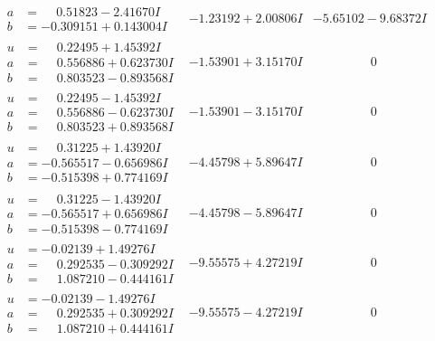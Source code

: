 \documentclass[1p]{elsarticle_modified}
\theoremstyle{definition}
\begin{document}
$$\begin{array}{c|c|c}
\begin{aligned}
a &= \phantom{-}0.51823 - 2.41670 I \\
b &= -0.309151 + 0.143004 I\end{aligned}
 & -1.23192 + 2.00806 I & -5.65102 - 9.68372 I \\ \hline\begin{aligned}
u &= \phantom{-}0.22495 + 1.45392 I \\
a &= \phantom{-}0.556886 + 0.623730 I \\
b &= \phantom{-}0.803523 - 0.893568 I\end{aligned}
 & -1.53901 + 3.15170 I & \phantom{-0.000000 } 0 \\ \hline\begin{aligned}
u &= \phantom{-}0.22495 - 1.45392 I \\
a &= \phantom{-}0.556886 - 0.623730 I \\
b &= \phantom{-}0.803523 + 0.893568 I\end{aligned}
 & -1.53901 - 3.15170 I & \phantom{-0.000000 } 0 \\ \hline\begin{aligned}
u &= \phantom{-}0.31225 + 1.43920 I \\
a &= -0.565517 - 0.656986 I \\
b &= -0.515398 + 0.774169 I\end{aligned}
 & -4.45798 + 5.89647 I & \phantom{-0.000000 } 0 \\ \hline\begin{aligned}
u &= \phantom{-}0.31225 - 1.43920 I \\
a &= -0.565517 + 0.656986 I \\
b &= -0.515398 - 0.774169 I\end{aligned}
 & -4.45798 - 5.89647 I & \phantom{-0.000000 } 0 \\ \hline\begin{aligned}
u &= -0.02139 + 1.49276 I \\
a &= \phantom{-}0.292535 - 0.309292 I \\
b &= \phantom{-}1.087210 - 0.444161 I\end{aligned}
 & -9.55575 + 4.27219 I & \phantom{-0.000000 } 0 \\ \hline\begin{aligned}
u &= -0.02139 - 1.49276 I \\
a &= \phantom{-}0.292535 + 0.309292 I \\
b &= \phantom{-}1.087210 + 0.444161 I\end{aligned}
 & -9.55575 - 4.27219 I & \phantom{-0.000000 } 0 \\ \hline\begin{aligned}

\end{aligned}
\end{array}$$
\end{document}
